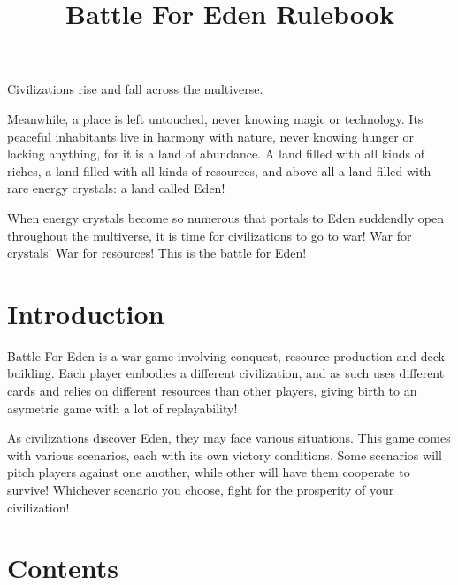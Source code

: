 \documentclass[a4paper]{article}
\begin{document}
\title{Battle For Eden Rulebook}
\maketitle


    Civilizations rise and fall across the multiverse.

    Meanwhile, a place is left untouched, never knowing magic or technology.
    Its peaceful inhabitants live in harmony with nature, never knowing hunger or lacking anything, for it is a land of abundance.
    A land filled with all kinds of riches, a land filled with all kinds of resources,
    and above all a land filled with rare energy crystals: a land called Eden!

    When energy crystals become so numerous that portals to Eden suddendly open throughout the multiverse,
    it is time for civilizations to go to war! War for crystals! War for resources!
    This is the battle for Eden!



\section{Introduction}

    Battle For Eden is a war game involving conquest, resource production and deck building.
    Each player embodies a different civilization, and as such uses different cards and relies on
    different resources than other players, giving birth to an asymetric game with a lot of replayability!

    As civilizations discover Eden, they may face various situations.
    This game comes with various scenarios, each with its own victory conditions.
    Some scenarios will pitch players against one another, while other will have them cooperate to survive!
    Whichever scenario you choose, fight for the prosperity of your civilization!



\section{Contents}
\end{document}

